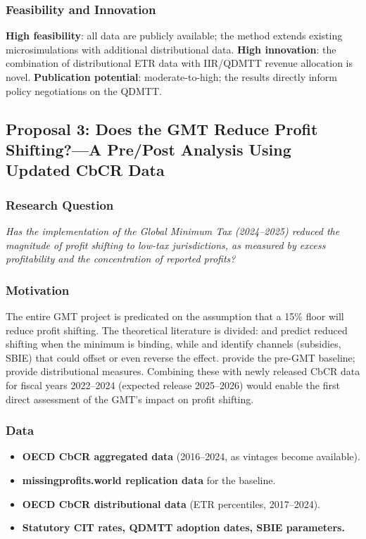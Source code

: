 \documentclass[11pt,a4paper]{article}
\begin{document}
\subsubsection{Feasibility and Innovation}
\textbf{High feasibility}: all data are publicly available; the method extends existing microsimulations with additional distributional data. \textbf{High innovation}: the combination of distributional ETR data with IIR/QDMTT revenue allocation is novel. \textbf{Publication potential}: moderate-to-high; the results directly inform policy negotiations on the QDMTT.


\subsection{Proposal 3: Does the GMT Reduce Profit Shifting?---A Pre/Post Analysis Using Updated CbCR Data}
\label{subsec:proposal3}

\subsubsection{Research Question}
\emph{Has the implementation of the Global Minimum Tax (2024--2025) reduced the magnitude of profit shifting to low-tax jurisdictions, as measured by excess profitability and the concentration of reported profits?}

\subsubsection{Motivation}
The entire GMT project is predicated on the assumption that a 15\% floor will reduce profit shifting. The theoretical literature is divided: \citet{Johannesen2022} and \citet{hebous2023} predict reduced shifting when the minimum is binding, while \citet{janeba2023} and \citet{schjelderup2024} identify channels (subsidies, SBIE) that could offset or even reverse the effect. \citet{torslov2022} provide the pre-GMT baseline; \citet{hugger2025} provide distributional measures. Combining these with newly released CbCR data for fiscal years 2022--2024 (expected release 2025--2026) would enable the first direct assessment of the GMT's impact on profit shifting.

\subsubsection{Data}
\begin{itemize}[nosep]
    \item \textbf{OECD CbCR aggregated data} (2016--2024, as vintages become available).
    \item \textbf{missingprofits.world replication data} for the \citet{torslov2022} baseline.
    \item \textbf{OECD CbCR distributional data} (ETR percentiles, 2017--2024).
    \item \textbf{Statutory CIT rates, QDMTT adoption dates, SBIE parameters.}
\end{itemize}
\end{document}
